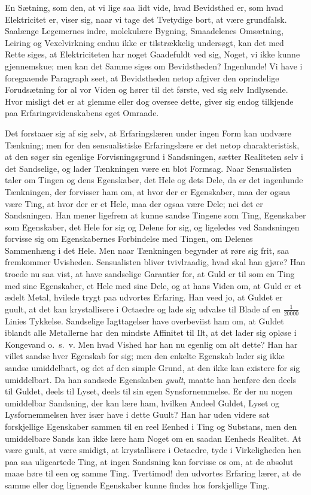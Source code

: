 \documentclass[12pt]{book}
\newcommand{\apage}[1]{\marginnote{\footnotesize\textit{[#1]}}}
\begin{document}
En Sætning, som den, at vi lige saa lidt vide, hvad Bevidsthed er, som
hvad Elektricitet er, viser sig, naar vi tage det Tvetydige bort, at være
grundfalsk. Saalænge Legemernes indre, molekulære Bygning, Smaadelenes
Omsætning, Leiring og Vexelvirkning endnu ikke er tilstrækkelig undersøgt,
kan det med Rette siges, at Elektriciteten har noget Gaadefuldt ved sig,
Noget, vi ikke kunne gjennemskue; men kan \apage{16} det Samme siges om Bevidstheden?
Ingenlunde! Vi have i foregaaende Paragraph seet, at Bevidstheden netop
afgiver den oprindelige Forudsætning for al vor Viden og hører til det
første, ved sig selv Indlysende. Hvor misligt det er at glemme eller dog
oversee dette, giver sig endog tilkjende paa Erfaringsvidenskabens eget
Omraade.

Det forstaaer sig af sig selv, at Erfaringslæren under ingen Form kan
undvære Tænkning; men for den sensualistiske Erfaringslære er det netop
charakteristisk, at den søger sin egenlige Forvisningsgrund i Sandsningen,
sætter Realiteten selv i det Sandselige, og lader Tænkningen være en blot
Formsag. Naar Sensualisten taler om Tingen og dens Egenskaber, det Hele og
dets Dele, da er det ingenlunde Tænkningen, der forvisser ham om, at hvor
der er Egenskaber, maa der ogsaa være Ting, at hvor der er et Hele, maa
der ogsaa være Dele; nei det er Sandsningen. Han mener ligefrem at kunne
sandse Tingene som Ting, Egenskaber som Egenskaber, det Hele for sig og
Delene for sig, og ligeledes ved Sandsningen forvisse sig om Egenskabernes
Forbindelse med Tingen, om Delenes Sammenhæng i det Hele. Men naar
Tænkningen begynder at røre sig frit, saa fremkommer Uvisheden.
Sensualisten bliver tvivlraadig, hvad skal han gjøre? Han troede nu saa
vist, at have sandselige Garantier for, at Guld er til som en Ting med
sine Egenskaber, et Hele med sine Dele, og at hans Viden om, at Guld er et
ædelt Metal, hvilede trygt paa udvortes Erfaring. Han veed jo, at Guldet
er guult, at  \apage{17} det kan krystallisere i Octaedre og lade sig udvalse til
Blade af en $\frac{1}{20000}$ Linies Tykkelse. Sandselige Iagttagelser
have overbeviist ham om, at Guldet iblandt alle Metallerne har den mindste
Affinitet til Ilt, at det lader sig opløse i Kongevand o.\ s.\ v. Men hvad
Vished har han nu egenlig om alt dette? Han har villet sandse hver
Egenskab for sig; men den enkelte Egenskab lader sig ikke sandse
umiddelbart, og det af den simple Grund, at den ikke kan existere for sig
umiddelbart. Da han sandsede Egenskaben \emph{guult}, maatte han henføre den
deels til Guldet, deels til Lyset, deels til sin egen Synsfornemmelse. Er
der nu nogen umiddelbar Sandsning, der kan lære ham, hvilken Andeel
Guldet, Lyset og Lysfornemmelsen hver især have i dette Guult? Han har
uden videre sat forskjellige Egenskaber sammen til en reel Eenhed i Ting
og Substans, men den umiddelbare Sands kan ikke lære ham Noget om en
saadan Eenheds Realitet. At være guult, at være smidigt, at krystallisere
i Octaedre, tyde i Virkeligheden hen paa saa uligeartede Ting, at ingen
Sandsning kan forvisse os om, at de absolut maae høre til een og samme
Ting. Tvertimod! den udvortes Erfaring lærer, at de samme eller dog
lignende Egenskaber kunne findes hos forskjellige Ting.
\end{document}
